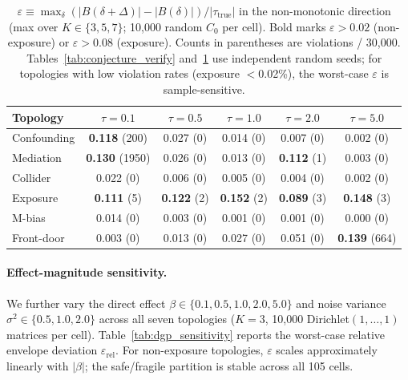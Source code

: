 \begin{table}[h]
\centering
\small
\caption{$\varepsilon \equiv \max_\delta(|B(\delta{+}\Delta)|{-}|B(\delta)|)/|\tau_{\text{true}}|$ in the non-monotonic direction (max over $K \in \{3,5,7\}$; 10{,}000 random $C_0$ per cell). Bold marks $\varepsilon > 0.02$ (non-exposure) or $\varepsilon > 0.08$ (exposure). Counts in parentheses are violations / 30{,}000. Tables~\ref{tab:conjecture_verify} and~\ref{tab:conjecture_tau_sens} use independent random seeds; for topologies with low violation rates (exposure $<$0.02\%), the worst-case $\varepsilon$ is sample-sensitive.}
\label{tab:conjecture_tau_sens}
\begin{tabular}{lccccc}
\toprule
\textbf{Topology} & $\tau{=}0.1$ & $\tau{=}0.5$ & $\tau{=}1.0$ & $\tau{=}2.0$ & $\tau{=}5.0$ \\
\midrule
Confounding & \textbf{0.118} (200) & 0.027 (0) & 0.014 (0) & 0.007 (0) & 0.002 (0) \\
Mediation   & \textbf{0.130} (1950) & 0.026 (0) & 0.013 (0) & \textbf{0.112} (1) & 0.003 (0) \\
Collider    & 0.022 (0) & 0.006 (0) & 0.005 (0) & 0.004 (0) & 0.002 (0) \\
Exposure    & \textbf{0.111} (5) & \textbf{0.122} (2) & \textbf{0.152} (2) & \textbf{0.089} (3) & \textbf{0.148} (3) \\
M-bias      & 0.014 (0) & 0.003 (0) & 0.001 (0) & 0.001 (0) & 0.000 (0) \\
Front-door  & 0.003 (0) & 0.013 (0) & 0.027 (0) & 0.051 (0) & \textbf{0.139} (664) \\
\bottomrule
\end{tabular}
\end{table}

\paragraph{Effect-magnitude sensitivity.}
We further vary the direct effect $\beta \in \{0.1, 0.5, 1.0, 2.0, 5.0\}$ and noise variance $\sigma^2 \in \{0.5, 1.0, 2.0\}$ across all seven topologies ($K{=}3$, 10{,}000 Dirichlet$(1,\ldots,1)$ matrices per cell). Table~\ref{tab:dgp_sensitivity} reports the worst-case relative envelope deviation $\varepsilon_{\text{rel}}$. For non-exposure topologies, $\varepsilon$ scales approximately linearly with $|\beta|$; the safe/fragile partition is stable across all 105 cells.



